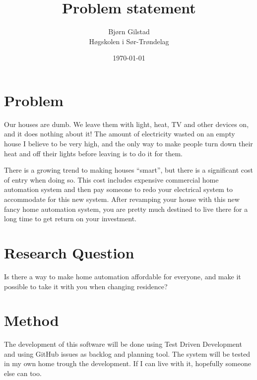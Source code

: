 \documentclass[12pt,norsk,a4paper]{article}
\title{Problem statement}
\author{Bjørn Gilstad \\
  Høgskolen i Sør-Trøndelag\\
}
\date{\today}
\begin{document}
\maketitle


\section{Problem}
Our houses are dumb. We leave them with light, heat, TV and other devices on, and it does nothing about
it! The amount of electricity wasted on an empty house I believe to be very high, and the only way to
make people turn down their heat and off their lights before leaving is to do it for them.

There is a growing trend to making houses ``smart'', but there is a significant cost of entry when
doing so. This cost includes expensive commercial home automation system and then pay someone to
redo your electrical system to accommodate for this new system. After revamping your house with this
new fancy home automation system, you are pretty much destined to live there for a long time to get
return on your investment.

\section{Research Question}
Is there a way to make home automation affordable for everyone, and make it possible to take it with
you when changing residence?

\section{Method}
The development of this software will be done using Test Driven Development and using GitHub issues
as backlog and planning tool. The system will be tested in my own home trough the development. If I
can live with it, hopefully someone else can too.
\end{document}
